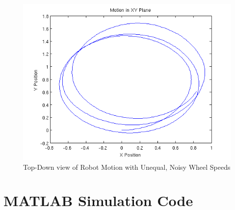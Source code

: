 \documentclass[10pt]{article}
\begin{document}
\begin{figure}[h]
 \centering
 \includegraphics[scale=0.55,keepaspectratio=true]{unequalnoiseplane.png}
 \caption{Top-Down view of Robot Motion with Unequal, Noisy Wheel Speeds}
 \label{fig:unequalnoiseplane}
\end{figure}

\newpage
\section{MATLAB Simulation Code}


\end{document}
